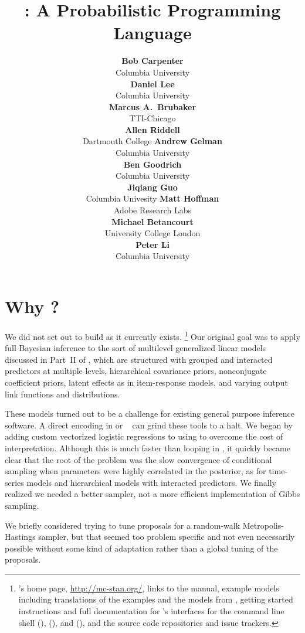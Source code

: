 \documentclass[article]{jss}
\author{{\bf\large Bob Carpenter}
        \\ Columbia University
        \\[9pt]
        {\bf\large Daniel Lee}
        \\ Columbia University
        \\[9pt]
        {\bf\large Marcus A.\ Brubaker}
        \\ TTI-Chicago
        \\[9pt]
        {\bf\large Allen Riddell}
        \\ Dartmouth College
    \And
        {\bf\large Andrew Gelman}
        \\ Columbia University
        \\[9pt]
        {\bf\large Ben Goodrich}
        \\ Columbia University
        \\[9pt]
        {\bf\large Jiqiang Guo}
        \\ Columbia Univesity
     \And
        {\bf\large Matt Hoffman}
        \\ Adobe Research Labs
        \\[9pt]
        {\bf\large Michael Betancourt}
        \\ University College London
        \\[9pt]
        {\bf\large Peter Li}
        \\ Columbia University
        \\[9pt]
}
\title{\proglang{Stan}: A Probabilistic Programming Language}
\begin{document}

\section[Why Stan?]{Why ?}

We did not set out to build  as it currently exists.%
%
\footnote{'s home page, \url{http://mc-stan.org/},
  links to the  manual, example models including translations of
  the  examples and the models from \citep{GelmanHill:2007},
  getting started instructions and full documentation for 's
  interfaces for the command line shell (), 
  (), and  (), and the source code repositories
  and issue trackers.}
%
Our original goal was to apply full Bayesian inference to the sort of multilevel
generalized linear models discussed in Part~II of
\citep{GelmanHill:2007}, which are structured with grouped and
interacted predictors at multiple levels, hierarchical covariance
priors, nonconjugate coefficient priors, latent effects as in
item-response models, and varying output link functions and
distributions.

These models turned out to be a challenge for existing general purpose
inference software.  A direct encoding in 
\citep{LunnEtAl:2000,LunnEtAl:2009,LunnEtAl:2012} or
~\citep{Plummer:2003} can grind these tools to a halt.
We began by adding custom vectorized logistic regressions to
 using  to overcome the cost of
interpretation.  Although this is much faster than looping in
, it quickly became clear that the root of the problem
was the slow convergence of conditional sampling when parameters were
highly correlated in the posterior, as for time-series models and
hierarchical models with interacted predictors.  We finally realized
we needed a better sampler, not a more efficient implementation of
Gibbs sampling.

We briefly considered trying to tune proposals for a random-walk
Metropolis-Hastings sampler, but that seemed too problem specific and
not even necessarily possible without some kind of adaptation rather
than a global tuning of the proposals. 
\end{document}
